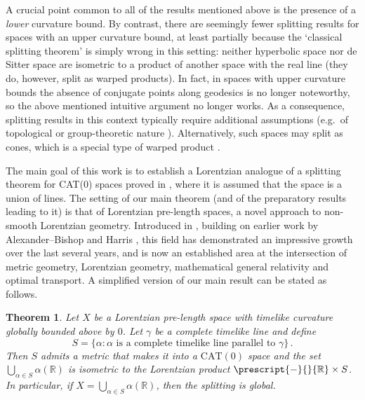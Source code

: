 \documentclass[11pt,reqno]{amsart}
\theoremstyle{definition}
\theoremstyle{definition}
\theoremstyle{plain}
\newtheorem{thm}[dfn]{Theorem}
\theoremstyle{remark}
\newcommand{\R}{\mathbb R}
\newcommand{\LpLS}{Lorentzian pre-length space }
\begin{document}
A crucial point common to all of the results mentioned above is the presence of a \emph{lower} curvature bound. 
By contrast, there are seemingly fewer splitting results for spaces with an upper curvature bound, at least partially because the `classical splitting theorem' is simply wrong in this setting: neither hyperbolic space nor de Sitter space are isometric to a product of another space with the real line (they do, however, split as warped products). 
In fact, in spaces with upper curvature bounds the absence of conjugate points along geodesics is no longer noteworthy, so the above mentioned intuitive argument no longer works. 
As a consequence, splitting results in this context typically require additional assumptions (e.g.\ of topological or group-theoretic nature \cite{burago-burago-ivanov2001, GW71, Inn82, LY72,  Sch85}). 
Alternatively, such spaces may split as cones, which is a special type of warped product \cite{AB05}. 

The main goal of this work is to establish a Lorentzian analogue of a splitting theorem for CAT($0$) spaces proved in \cite{burago-burago-ivanov2001}, where it is assumed that the space is a union of lines. 
The setting of our main theorem (and of the preparatory results leading to it) is that of Lorentzian pre-length spaces, a novel approach to non-smooth Lorentzian geometry. 
Introduced in \cite{kunzinger-saemann2018}, building on earlier work by Alexander--Bishop \cite{alexander-bishop2008} and Harris \cite{harris1982}, this field has demonstrated an impressive growth over the last several years, and is now an established area at the intersection of metric geometry, Lorentzian geometry, mathematical general relativity and optimal transport. 
A simplified version of our main result can be stated as follows. 

\begin{thm}\label{thm:main}
Let $X$ be a \LpLS with timelike curvature globally bounded above by $0$. Let $\gamma$ be a complete timelike line and define
\[
S=\{\alpha:\alpha\text{ is a complete timelike line parallel to }\gamma\}\,.
\]
Then $S$ admits a metric that makes it into a $\mathrm{CAT}(0)$ space and the set $\bigcup_{\alpha\in S}\alpha(\R)$ is isometric to the Lorentzian product $\prescript{-}{}{\R}\times S$. 
In particular, if $X=\bigcup_{\alpha\in S}\alpha(\R)$, then the splitting is global.
\end{thm}
\end{document}
